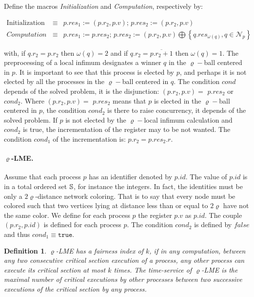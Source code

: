 \documentclass[11pt]{article}
\newtheorem{definition}[theorem]{Definition}
\newcommand{\TRUE}{\mathtt{true}}
\newcommand{\text}[1]{\mbox{#1}}
\begin{document}
Define the macros \emph{Initialization} and \emph{Computation}, respectively by:
\begin{center}
$
\begin{array}{rcl}
\text{Initialization } & \equiv & p.res_{1}:=\left( p.r_{2},p.v\right) \text{; }
p.res_{2}:=\left( p.r_{2},p.v\right) \\
Computation & \equiv & p.res_{1}:=p.res_{2}\text{; }p.res_{2}:=\left(
p.r_{2},p.v\right) \bigoplus \left\{ q.res_{\omega  \left( q\right) },q\in 
\mathcal{N}_{p}\right\} 
\end{array}
$
\end{center}
with, if $q.r_{2}=p.r_{2}$ then $\omega  \left( q\right) =2$ and if $q.r_{2}=\overline{p.r_{2}+1}$ then $\omega  \left( q\right) =1$. 
The preprocessing of a local infimum designates a winner $q$ in the $\varrho -
$ball centered in $p$. It is important to see that this process is elected
by $p$, and perhaps it is not elected by all the processes in the  $\varrho -$ball centered in $q$.  
The condition $cond$ depends of the solved problem, it is the disjunction: $
\left( p.r_{2},p.v\right) =$ $p.res_{2}$ or  $cond_{2}$. Where $\left(
p.r_{2},p.v\right) =$ $p.res_{2}$ means that $p$ is elected in the  $\varrho -
$ball centered in $p$, the condition $cond_{2}$ is there to raise
concurrency, it depends of the solved problem.
If  $p$ is not elected by the $\varrho -$local infimum calculation and $cond_{2}$ is true, the incrementation of the register may to be  not 
wanted. The condition $cond_{1}$ of the incrementation is: $p.r_{2}=p.res_{2}.r$.



\paragraph{$\varrho$-LME.}

Assume that each process $p$ has an identifier denoted by $p.id$. The
value of $p.id$ is in a total ordered set $\Bbb{S}$, for instance the
integers. In fact, the identities must be only a $2\varrho $-distance
network coloring. That is to say that every node must be colored
such that two vertices lying at distance less than or equal to $2\varrho $
have not the same color.
We define for each process $p$ the register $p.v$ as $p.id$. 
The couple $\left( p.r_{2},p.id\right) $ is defined for each process $p$. The condition $cond_2$ is defined by $false$ and thus $cond_1\equiv \TRUE$.



\begin{definition}
$\varrho$-LME has a fairness index of $k$, if in any computation, between
any two consecutive critical section execution of a process, any other
process can execute its critical section at most $k$ times. The time-service
of $\varrho$-LME is the maximal number of critical executions by other
processes between two successive executions of the critical section by any
process.
\end{definition}
\end{document}
